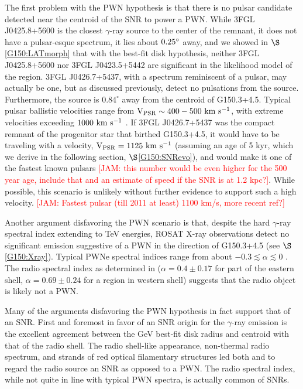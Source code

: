 \documentclass[iop]{emulateapj}
\newcommand{\kibitz}[2]{\ifnum\Comments=1\textcolor{#1}{#2}\fi}
\newcommand{\jamie}[1]{\kibitz{red}      {[JAM: #1]}}
\newcommand{\gam}{$\gamma$-ray}
\newcommand{\Gone}{G150.3+4.5}
\newcommand{\psrLike}{3FGL J0426.7+5437}
\begin{document}
The first problem with the PWN hypothesis is that there is no pulsar candidate detected near the centroid of the SNR to power a PWN. While 3FGL J0425.8+5600 is the closest \gam{} source to the center of the remnant, it does not have a pulsar-esque spectrum, it lies about ${\rm 0.25^\circ }$ away, and we showed in $\S$\ref{G150:LATmorph} that with the best-fit disk hypothesis, neither 3FGL J0425.8+5600 nor 3FGL J0423.5+5442 are significant in the likelihood model of the region. \psrLike{}, with a spectrum reminiscent of a pulsar,  may actually be one, but as discussed previously, \cite{Barr13} detect no pulsations from the source. %
 Furthermore, the source is $0.84^\circ$ away from the centroid of \Gone{}. Typical pulsar ballistic velocities range from ${\rm V_{PSR} \sim 400-500~km~s^{-1}}$, with extreme velocities exceeding ${\rm 1000~km~s^{-1}}$ \citep{Gaensler06}. If \psrLike{} was the compact remnant of the progenitor star that birthed \Gone{}, it would have to be traveling with a velocity, ${\rm V_{PSR} = 1125~km~s^{-1}}$ (assuming an age of 5 kyr, which we derive in the following section, $\S$\ref{G150:SNRevo}), and would make it one of the fastest known pulsars \citep{Chatterjee05} \jamie{this number would be even higher for the 500 year age, include that and an estimate of speed if the SNR is at 1.2 kpc?}. While possible, this scenario is unlikely without further evidence to support such a high velocity. \jamie{Fastest pulsar (till 2011 at least) 1100 km/s, more recent ref?}

Another argument disfavoring the PWN scenario is that, despite the hard \gam{} spectral index extending to TeV energies, ROSAT X-ray observations detect no significant emission suggestive of a PWN in the direction of \Gone{} (see  $\S$\ref{G150:Xray}). 
Typical PWNe spectral indices range from about $-0.3 \lesssim \alpha  \lesssim  0$ \citep{Gaensler06}. The radio spectral index  as determined in \cite{Gao14}  ($\alpha = 0.4 \pm 0.17$ for part of the eastern shell, $\alpha = 0.69 \pm 0.24$ for a region in western shell) suggests that the radio object is likely not a PWN.

Many of the arguments disfavoring the PWN hypothesis in fact support that of an SNR. First and foremost in favor of an SNR origin for the \gam{} emission is the excellent agreement between the GeV best-fit disk radius and centroid with that of the radio shell.  The radio shell-like appearance, non-thermal radio spectrum, and strands of red optical filamentary structures led both \cite{Gao14} and \cite{Gerbrandt14} to regard the radio source an SNR as opposed to a PWN.  The radio spectral index, while not quite in line with typical PWN spectra, is actually  common of SNRs.
\end{document}
